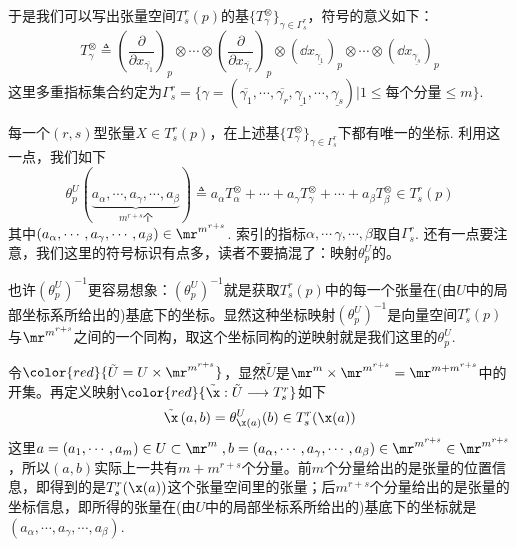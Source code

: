 于是我们可以写出张量空间$T^{r}_{s}(p)$的基$\{T^{\otimes}_{\gamma} \}_{\gamma\in \Gamma^{r}_{s}}$，符号的意义如下：
\[
T^{\otimes}_{\gamma}\triangleq \left( \frac { \partial } { \partial x _ { \overline{\gamma_{1}} } } \right) _ { p } \otimes \cdots \otimes \left( \frac { \partial } { \partial x _ {  \overline{\gamma_{r}} } }\right) _ { p }\otimes (\dd x_{\underline{\gamma_{1}}})_{p}\otimes\cdots\otimes(\dd x_{\underline{\gamma_{s}}})_{p} 
\]
这里多重指标集合约定为$\Gamma^{r}_{s}=\{\gamma=( \overline{\gamma_{1}},\cdots, \overline{\gamma_{r}},\underline{\gamma_{1}},\cdots,\underline{\gamma_{s}}) | 1\leqslant\text{每个分量}\leqslant m\}$. 

每一个$(r,s)$型张量$X\in T^{r}_{s}(p)$，在上述基$\{T^{\otimes}_{\gamma} \}_{\gamma\in \Gamma^{r}_{s}}$下都有唯一的坐标. 利用这一点，我们{}如下
\begin{equation}
	\theta^{U}_{p}(\underbrace{a_{\alpha},\cdots,a_{\gamma},\cdots,a_{\beta}}_{m^{r+s}\text{个}})\triangleq a_{\alpha} T^{\otimes}_{\alpha}+\cdots+a_{\gamma} T^{\otimes}_{\gamma}+\cdots+a_{\beta} T^{\otimes}_{\beta}\in T^{r}_{s}(p)
\end{equation}
其中$(a_{\alpha},\cdots,a_{\gamma},\cdots,a_{\beta})\in \mr^{m^{r+s}}$. 索引的指标$\alpha,\cdots\,\gamma,\cdots,\beta$取自$\Gamma^{r}_{s}$. 还有一点要注意，我们这里的符号标识有点多，读者不要搞混了：映射$\theta^{U}_{p}$的{\color{blue}{下标$p$用来标识值域，上标$U$用来标识值域中所用的基底}}。

也许$(\theta^{U}_{p})^{-1}$更容易想象：$(\theta^{U}_{p})^{-1}$就是获取$T^{r}_{s}(p)$中的每一个张量在(由$U$中的局部坐标系所给出的)基底下的坐标。显然这种坐标映射$(\theta^{U}_{p})^{-1}$是向量空间$T^{r}_{s}(p)$与$ \mr^{m^{r+s}}$之间的一个同构，取这个坐标同构的逆映射就是我们这里的$\theta^{U}_{p}$. 

令${\color{red}{\tilde{  U  }=U\times \mr^{m^{r+s}}}}$，显然$\tilde{  U  }$是$\mr^{m}\times\mr^{m^{r+s}}=\mr^{m+m^{r+s}}$中的开集。再定义映射${\color{red}{\tilde{  \x  }:\tilde{  U  }\longrightarrow T^{r}_{s}}}$如下
\begin{equation}
	\tilde{  \x  }\left(a,b \right)=\theta^{U}_{\x(a)}(b)\in T^{r}_{s}(\x(a))
\end{equation}
这里$a=(a_{1},\cdots,a_{m})\in U\subset\mr^{m} \;, b=(a_{\alpha},\cdots,a_{\gamma},\cdots,a_{\beta})\in \mr^{m^{r+s}}\in  \mr^{m^{r+s}}$，所以$\left(a,b \right)$实际上一共有$m+m^{r+s}$个分量。前$m$个分量给出的是张量的位置信息，即得到的是$T^{r}_{s}(\x(a))$这个张量空间里的张量；后$m^{r+s}$个分量给出的是张量的坐标信息，即所得的张量在(由$U$中的局部坐标系所给出的)基底下的坐标就是$(a_{\alpha},\cdots,a_{\gamma},\cdots,a_{\beta})$.

